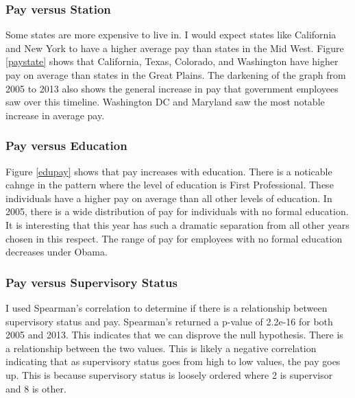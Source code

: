 \documentclass{article}
\begin{document}
        \subsubsection{Pay versus Station}
        Some states are more expensive to live in. I would expect states like California and New York to have a higher average pay than states in the Mid West. Figure \ref{paystate} shows that California, Texas, Colorado, and Washington have higher pay on average than states in the Great Plains. The darkening of the graph from 2005 to 2013 also shows the general increase in pay that government employees saw over this timeline. Washington DC and Maryland saw the most notable increase in average pay.

        \subsubsection{Pay versus Education}
        Figure \ref{edupay} shows that pay increases with education. There is a noticable cahnge in the pattern where the level of education is First Professional. These individuals have a higher pay on average than all other levels of education. In 2005, there is a wide distribution of pay for individuals with no formal education. It is interesting that this year has such a dramatic separation from all other years chosen in this respect. The range of pay for employees with no formal education decreases under Obama.

        \subsubsection{Pay versus Supervisory Status}
        I used Spearman's correlation to determine if there is a relationship between supervisory status and pay. Spearman's returned a p-value of 2.2e-16 for both 2005 and 2013. This indicates that we can disprove the null hypothesis. There is a relationship between the two values. This is likely a negative correlation indicating that as supervisory status goes from high to low values, the pay goes up. This is because supervisory status is loosely ordered where 2 is supervisor and 8 is other.
\end{document}
